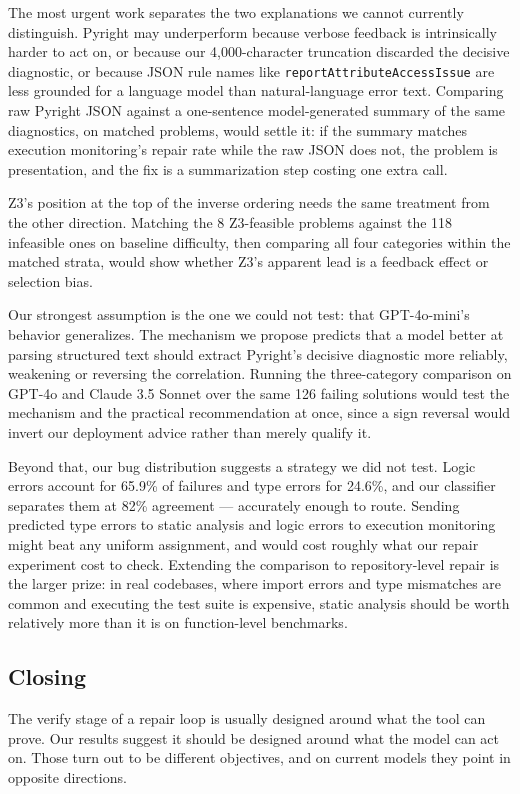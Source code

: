 The most urgent work separates the two explanations we cannot currently distinguish. Pyright may underperform because verbose feedback is intrinsically harder to act on, or because our 4,000-character truncation discarded the decisive diagnostic, or because JSON rule names like \texttt{reportAttributeAccessIssue} are less grounded for a language model than natural-language error text. Comparing raw Pyright JSON against a one-sentence model-generated summary of the same diagnostics, on matched problems, would settle it: if the summary matches execution monitoring's repair rate while the raw JSON does not, the problem is presentation, and the fix is a summarization step costing one extra call.

Z3's position at the top of the inverse ordering needs the same treatment from the other direction. Matching the 8 Z3-feasible problems against the 118 infeasible ones on baseline difficulty, then comparing all four categories within the matched strata, would show whether Z3's apparent lead is a feedback effect or selection bias.

Our strongest assumption is the one we could not test: that GPT-4o-mini's behavior generalizes. The mechanism we propose predicts that a model better at parsing structured text should extract Pyright's decisive diagnostic more reliably, weakening or reversing the correlation. Running the three-category comparison on GPT-4o and Claude 3.5 Sonnet over the same 126 failing solutions would test the mechanism and the practical recommendation at once, since a sign reversal would invert our deployment advice rather than merely qualify it.

Beyond that, our bug distribution suggests a strategy we did not test. Logic errors account for 65.9\% of failures and type errors for 24.6\%, and our classifier separates them at 82\% agreement --- accurately enough to route. Sending predicted type errors to static analysis and logic errors to execution monitoring might beat any uniform assignment, and would cost roughly what our repair experiment cost to check. Extending the comparison to repository-level repair is the larger prize: in real codebases, where import errors and type mismatches are common and executing the test suite is expensive, static analysis should be worth relatively more than it is on function-level benchmarks.

\subsection{Closing}

The verify stage of a repair loop is usually designed around what the tool can prove. Our results suggest it should be designed around what the model can act on. Those turn out to be different objectives, and on current models they point in opposite directions.
